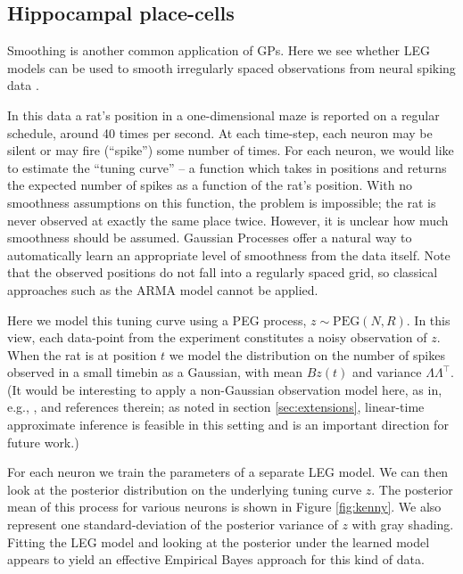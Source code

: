 \documentclass{article}
\theoremstyle{definition}
\newcommand{\PEGGP}{\mathrm{PEG}}
\begin{document}
\subsection{Hippocampal place-cells}

Smoothing is another common application of GPs.  Here we see whether LEG models can be used to smooth irregularly spaced observations from neural spiking data \cite{grosmark2016diversity}.  

In this data a rat's position in a one-dimensional maze is reported on a regular schedule, around 40 times per second.  At each time-step, each neuron may be silent or may fire (``spike'') some number of times.  For each neuron, we would like to estimate the ``tuning curve'' -- a function which takes in positions and returns the expected number of spikes as a function of the rat's position.  With no smoothness assumptions on this function, the problem is impossible; the rat is never observed at exactly the same place twice.  However, it is unclear how much smoothness should be assumed.  Gaussian Processes offer a natural way to automatically learn an appropriate level of smoothness from the data itself.  Note that the observed positions do not fall into a regularly spaced grid, so classical approaches such as the ARMA model cannot be applied.  

Here we model this tuning curve using a PEG process, $z\sim \PEGGP(N,R)$.  In this view, each data-point from the experiment constitutes a noisy observation of $z$.  When the rat is at position $t$  we model the distribution on the number of spikes observed in a small timebin as a Gaussian, with mean $B z(t)$ and variance $\Lambda \Lambda^\top$.  (It would be interesting to apply a non-Gaussian observation model here, as in, e.g., \cite{smith2003estimating,rad2010efficient,savin2016,gao2016linear}, and references therein; 
as noted in section \ref{sec:extensions}, linear-time approximate inference is feasible in this setting and is an important direction for future work.)

For each neuron we train the parameters of a separate LEG model.  We can then look at the posterior distribution on the underlying tuning curve $z$.  The posterior mean of this process for various neurons is shown in Figure \ref{fig:kenny}.  We also represent one standard-deviation of the posterior variance of $z$ with gray shading.   Fitting the LEG model and looking at the posterior under the learned model appears to yield an effective Empirical Bayes approach for this kind of data. 
\end{document}
